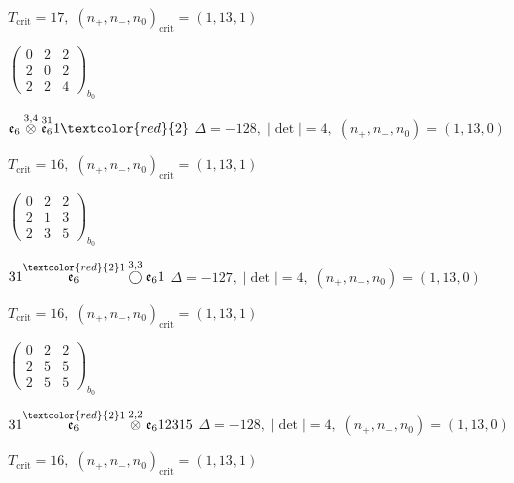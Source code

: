 \documentclass[10pt]{article}
\begin{document}
\hspace{1em}$T_{\text{crit}}=17,\; (n_+,n_-,n_0)_{\text{crit}}=(1,13,1)$

\hspace{2em}$\left(\begin{smallmatrix}0 & 2 & 2 \\ 2 & 0 & 2 \\ 2 & 2 & 4\end{smallmatrix}\right)_{\!b_0}$

\smallskip

$\mathfrak{e}_6\overset{3,4}{\otimes}\overset{31}{\mathfrak{e}_6}1\textcolor{red}{2}$ \quad $\Delta=-128,\; |\det|=4,\; (n_+,n_-,n_0)=(1,13,0)$

\hspace{1em}$T_{\text{crit}}=16,\; (n_+,n_-,n_0)_{\text{crit}}=(1,13,1)$

\hspace{2em}$\left(\begin{smallmatrix}0 & 2 & 2 \\ 2 & 1 & 3 \\ 2 & 3 & 5\end{smallmatrix}\right)_{\!b_0}$

\smallskip

$31\overset{\textcolor{red}{2}1}{\mathfrak{e}_6}\overset{3,3}{\bigcirc}\mathfrak{e}_61$ \quad $\Delta=-127,\; |\det|=4,\; (n_+,n_-,n_0)=(1,13,0)$

\hspace{1em}$T_{\text{crit}}=16,\; (n_+,n_-,n_0)_{\text{crit}}=(1,13,1)$

\hspace{2em}$\left(\begin{smallmatrix}0 & 2 & 2 \\ 2 & 5 & 5 \\ 2 & 5 & 5\end{smallmatrix}\right)_{\!b_0}$

\smallskip

$31\overset{\textcolor{red}{2}1}{\mathfrak{e}_6}\overset{2,2}{\otimes}\mathfrak{e}_612315$ \quad $\Delta=-128,\; |\det|=4,\; (n_+,n_-,n_0)=(1,13,0)$

\hspace{1em}$T_{\text{crit}}=16,\; (n_+,n_-,n_0)_{\text{crit}}=(1,13,1)$
\end{document}
